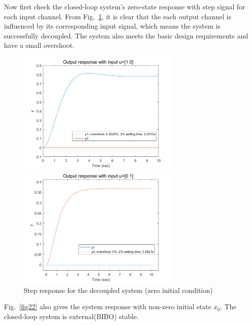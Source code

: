 \documentclass[hyperref]{article}
\theoremstyle{nonumberplain}
\begin{document}
	Now first check the closed-loop system's zero-state response with step signal for each input channel. From Fig.~\ref{fig21}, it is clear that the each output channel is influenced by its corresponding input signal, which means the system is successfully decoupled. The system also meets the basic design requirements and have a small overshoot. 
	
	\begin{figure}[H]
		\centering
		\begin{minipage}[t]{0.48\textwidth}
			\centering
			\includegraphics[width=8cm]{fig30.png}
		\end{minipage}
		\begin{minipage}[t]{0.48\textwidth}
			\centering
			\includegraphics[width=8cm]{fig31.png}
		\end{minipage}
		\caption{Step response for the decoupled system (zero initial condition)}
		\label{fig21}
	\end{figure}

	Fig.~\ref{fig22} also gives the system response with non-zero initial state $x_{0}$. The closed-loop system is external(BIBO) stable. 
	
\end{document}
